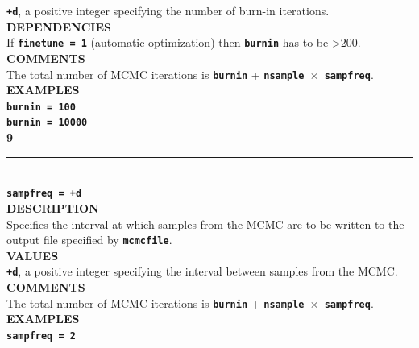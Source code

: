 \documentclass{book}
\numberwithin{equation}{section} \renewcommand{\baselinestretch}{0.55}
\begin{document}
\textbf{\texttt{+d}}, a positive integer specifying the number of burn-in iterations. \vspace{5pt}\\
\textbf{DEPENDENCIES} \vspace{5pt}\\
If \textbf{\texttt{finetune = 1}} (automatic optimization) then \textbf{\texttt{burnin}} has to be >200. \vspace{5pt}\\
\textbf{COMMENTS} \vspace{5pt}\\
The total number of MCMC iterations is \textbf{\texttt{burnin}} + \textbf{\texttt{nsample $\times$ sampfreq}}. \vspace{5pt}\\
\textbf{EXAMPLES} \vspace{5pt}\\
\textbf{\texttt{burnin = 100}} \vspace{5pt}\\
\textbf{\texttt{burnin = 10000}}\vspace{10pt}\\
\textbf{{\large 9}} \\
\noindent\rule{\textwidth}{0.8pt} \\
\textbf{{\Large \texttt{sampfreq = +d}}} \vspace{5pt}\\
\textbf{DESCRIPTION} \vspace{5pt}\\
Specifies the interval at which samples from the MCMC are to be written to the output file specified by \textbf{\texttt{mcmcfile}}. \vspace{5pt}\\
\textbf{VALUES} \vspace{5pt}\\
\textbf{\texttt{+d}}, a positive integer specifying the interval between samples from the MCMC. \vspace{5pt}\\
\textbf{COMMENTS} \vspace{5pt}\\
The total number of MCMC iterations is \textbf{\texttt{burnin}} + \textbf{\texttt{nsample $\times$ sampfreq}}. \vspace{5pt}\\
\textbf{EXAMPLES} \vspace{5pt}\\
\textbf{\texttt{sampfreq = 2}} \vspace{5pt}\\
\end{document}
